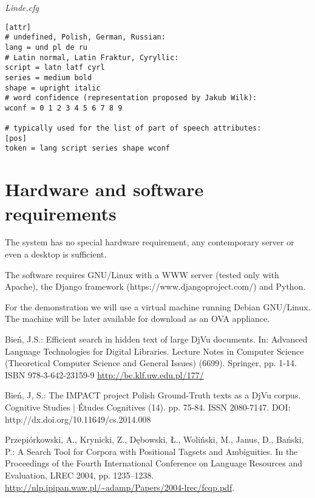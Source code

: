 \documentclass{article}
\begin{document}
\medskip

\noindent
{\it Linde.cfg}
\begin{verbatim}
[attr]
# undefined, Polish, German, Russian:
lang = und pl de ru
# Latin normal, Latin Fraktur, Cyryllic:
script = latn latf cyrl
series = medium bold
shape = upright italic
# word confidence (representation proposed by Jakub Wilk):
wconf = 0 1 2 3 4 5 6 7 8 9

# typically used for the list of part of speech attributes:
[pos]
token = lang script series shape wconf
\end{verbatim}
%


\section{Hardware and software requirements}
\label{sec:hardw-softw-requ}

The system has no special hardware requirement, any contemporary
server or even a desktop is sufficient.

The software requires GNU/Linux with a WWW server (tested only with
Apache), the Django framework (https://www.djangoproject.com/) and
Python.

For the demonstration we will use a virtual machine running Debian
GNU/Linux. The machine will be later available for download as an OVA
appliance.


\begin{thebibliography}{4}

 Bień, J.S.: Efficient search in hidden text of
  large DjVu documents. In: Advanced Language Technologies for Digital
  Libraries. Lecture Notes in Computer Science (Theoretical Computer
  Science and General Issues) (6699). Springer, pp. 1-14. ISBN
  978-3-642-23159-9 \url{http://bc.klf.uw.edu.pl/177/}

 Bień, J, S.: The IMPACT project Polish Ground-Truth texts as
a DjVu corpus. Cognitive Studies | Études Cognitives
(14). pp. 75-84. ISSN 2080-7147.
DOI: http://dx.doi.org/10.11649/cs.2014.008


 Przepiórkowski, A., Krynicki, Z., Dębowski, Ł.,
  Woliński, M., Janus, D., Bański, P.: A Search Tool for Corpora with
  Positional Tagsets and Ambiguities. In the Proceedings of the Fourth
  International Conference on Language Resources and Evaluation, LREC
  2004,
  pp. 1235--1238. \url{http://nlp.ipipan.waw.pl/~adamp/Papers/2004-lrec/fcqp.pdf}.


\end{thebibliography}
\end{document}
